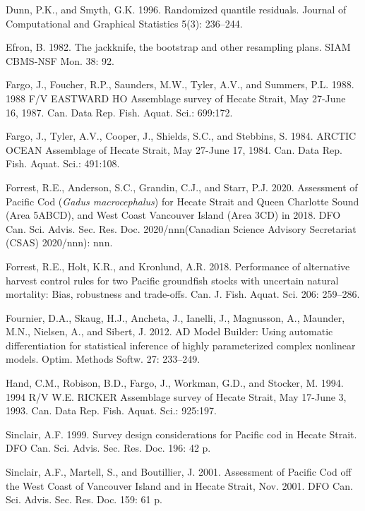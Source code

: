 \documentclass[11pt]{book}
\begin{document}
\leavevmode\hypertarget{ref-dunn1996}{}%
Dunn, P.K., and Smyth, G.K. 1996. Randomized quantile residuals. Journal of Computational and Graphical Statistics 5(3): 236--244.

\leavevmode\hypertarget{ref-efron1982}{}%
Efron, B. 1982. The jackknife, the bootstrap and other resampling plans. SIAM CBMS-NSF Mon. 38: 92.

\leavevmode\hypertarget{ref-fargo1988}{}%
Fargo, J., Foucher, R.P., Saunders, M.W., Tyler, A.V., and Summers, P.L. 1988. 1988 F/V EASTWARD HO Assemblage survey of Hecate Strait, May 27-June 16, 1987. Can. Data Rep. Fish. Aquat. Sci.: 699:172.

\leavevmode\hypertarget{ref-fargo1984}{}%
Fargo, J., Tyler, A.V., Cooper, J., Shields, S.C., and Stebbins, S. 1984. ARCTIC OCEAN Assemblage of Hecate Strait, May 27-June 17, 1984. Can. Data Rep. Fish. Aquat. Sci.: 491:108.

\leavevmode\hypertarget{ref-forrest2020}{}%
Forrest, R.E., Anderson, S.C., Grandin, C.J., and Starr, P.J. 2020. Assessment of Pacific Cod (\emph{Gadus macrocephalus}) for Hecate Strait and Queen Charlotte Sound (Area 5ABCD), and West Coast Vancouver Island (Area 3CD) in 2018. DFO Can. Sci. Advis. Sec. Res. Doc. 2020/nnn(Canadian Science Advisory Secretariat (CSAS) 2020/nnn): nnn.

\leavevmode\hypertarget{ref-forrest2018}{}%
Forrest, R.E., Holt, K.R., and Kronlund, A.R. 2018. Performance of alternative harvest control rules for two Pacific groundfish stocks with uncertain natural mortality: Bias, robustness and trade-offs. Can. J. Fish. Aquat. Sci. 206: 259--286.

\leavevmode\hypertarget{ref-fournier2012}{}%
Fournier, D.A., Skaug, H.J., Ancheta, J., Ianelli, J., Magnusson, A., Maunder, M.N., Nielsen, A., and Sibert, J. 2012. AD Model Builder: Using automatic differentiation for statistical inference of highly parameterized complex nonlinear models. Optim. Methods Softw. 27: 233--249.

\leavevmode\hypertarget{ref-hand1994}{}%
Hand, C.M., Robison, B.D., Fargo, J., Workman, G.D., and Stocker, M. 1994. 1994 R/V W.E. RICKER Assemblage survey of Hecate Strait, May 17-June 3, 1993. Can. Data Rep. Fish. Aquat. Sci.: 925:197.

\leavevmode\hypertarget{ref-sinclair2000}{}%
Sinclair, A.F. 1999. Survey design considerations for Pacific cod in Hecate Strait. DFO Can. Sci. Advis. Sec. Res. Doc. 196: 42 p.

\leavevmode\hypertarget{ref-sinclair2001}{}%
Sinclair, A.F., Martell, S., and Boutillier, J. 2001. Assessment of Pacific Cod off the West Coast of Vancouver Island and in Hecate Strait, Nov. 2001. DFO Can. Sci. Advis. Sec. Res. Doc. 159: 61 p.
\end{document}
